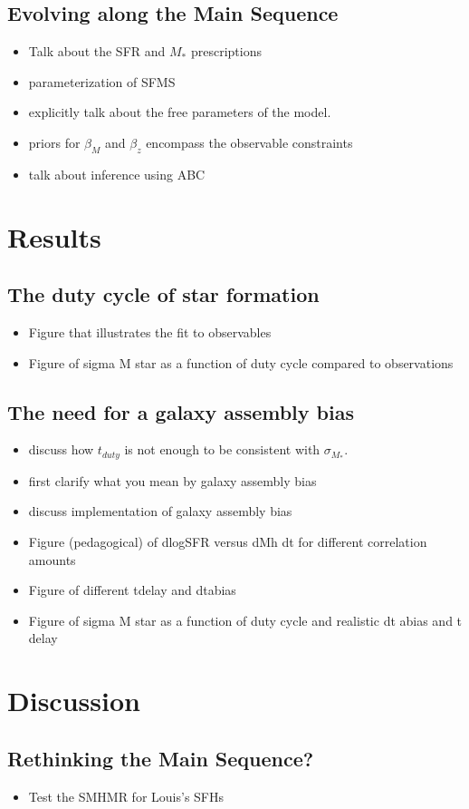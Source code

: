 \documentclass[12pt, letterpaper, preprint]{aastex}
\newcommand{\bitem}{\begin{itemize}}
\newcommand{\eitem}{\end{itemize}}
\begin{document}
\subsection{Evolving along the Main Sequence} 
\bitem
\item Talk about the SFR and $M_*$ prescriptions 
\item parameterization of SFMS 
\item explicitly talk about the free parameters of the model. 
\item priors for $\beta_M$ and $\beta_z$ encompass the observable constraints 
\item talk about inference using ABC
\eitem

\section{Results}
\subsection{The duty cycle of star formation}
\bitem
\item Figure that illustrates the fit to observables 
\item Figure of sigma M star as a function of duty cycle compared to observations 
\eitem 

\subsection{The need for a galaxy assembly bias}
\bitem
\item discuss how $t_{duty}$ is not enough to be consistent with $\sigma_{M_*}$. 
\item first clarify what you mean by galaxy assembly bias 
\item discuss implementation of galaxy assembly bias
\item Figure (pedagogical) of dlogSFR versus dMh dt for different correlation amounts 
\item Figure of different tdelay and dtabias 
\item Figure of sigma M star as a function of duty cycle and realistic dt abias and t delay 
\eitem

\section{Discussion} \label{sec:discussion}
\subsection{Rethinking the Main Sequence?}
\bitem 
\item Test the SMHMR for Louis's SFHs 
\eitem 
\end{document}
